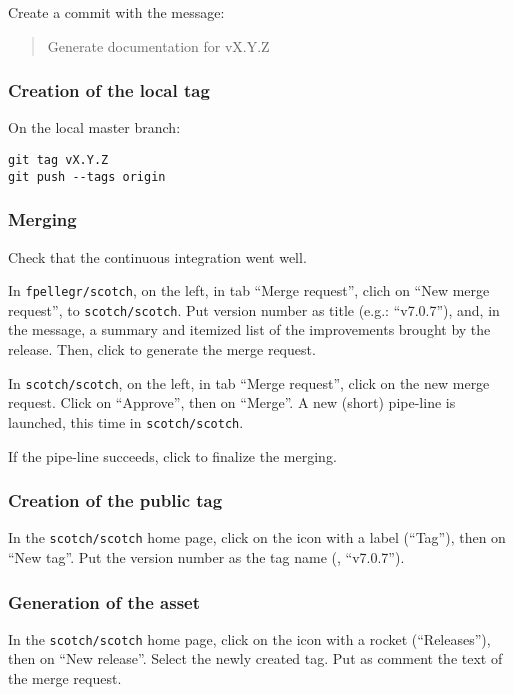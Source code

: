 Create a commit with the message:
\begin{quote}
Generate documentation for vX.Y.Z
\end{quote}

\subsubsection{Creation of the local tag}

On the local master branch:
\begin{lstlisting}
git tag vX.Y.Z
git push --tags origin
\end{lstlisting}

\subsubsection{Merging}

Check that the continuous integration went well.

\noi
In \texttt{fpellegr/scotch}, on the left, in tab ``Merge request'',
clich on ``New merge request'', to \texttt{scotch/scotch}. Put version
number as title (e.g.: ``v7.0.7''), and, in the message, a summary and
itemized list of the improvements brought by the release. Then, click
to generate the merge request.

\noi
In \texttt{scotch/scotch}, on the left, in tab ``Merge request'',
click on the new merge request. Click on ``Approve'', then on
``Merge''. A new (short) pipe-line is launched, this time in
\texttt{scotch/scotch}.

\noi
If the pipe-line succeeds, click to finalize the merging.

\subsubsection{Creation of the public tag}

In the \texttt{scotch/scotch} home page, click on the icon with a
label (``Tag''), then on ``New tag''. Put the version number as the
tag name (\eg, ``v7.0.7'').

\subsubsection{Generation of the asset}

In the \texttt{scotch/scotch} home page, click on the icon with a
rocket (``Releases''), then on ``New release''. Select the newly
created tag. Put as comment the text of the merge request.
